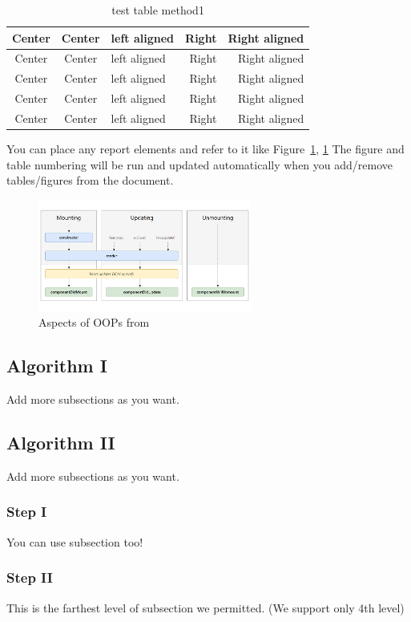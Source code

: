     
    \begin{table}[!h]
    \caption{test table method1}\label{tbl:method1}
        \begin{tabular}{c|c|l|rr} \hline\hline
            Center & Center & left aligned & Right & Right aligned \\ \hline\hline
            Center & Center & left aligned & Right & Right aligned \\ \hline
            Center & Center & left aligned & Right & Right aligned \\ 
            Center & Center & left aligned & Right & Right aligned \\ \hline
            Center & Center & left aligned & Right & Right aligned \\ \hline\hline
        \end{tabular}
    \end{table}

    You can place any report elements and refer to it like Figure~\ref{tbl:method1}, \ref{fig:oop-concept}
    The figure and table numbering will be run and updated automatically when you add/remove tables/figures from the document.

    \begin{figure}[H]
        \centering
        \includegraphics[width=7cm]{chapters/2/figures/react-lifecycle.png}
        \caption[Aspects of OOPs]{Aspects of OOPs from~\cite{apollo22oop}}
        \label{fig:oop-concept}
    \end{figure}
    
    \subsection{Algorithm I}
    Add more subsections as you want.
    \subsection{Algorithm II}
        Add more subsections as you want.
        \subsubsection{Step I}
            You can use subsection too!
        \subsubsection{Step II}
            This is the farthest level of subsection we permitted. (We support only 4th level)


\pagebreak